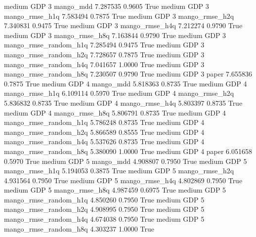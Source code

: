     medium      GDP                 3             mango_mdd   7.287535      0.9605    True
    medium      GDP                 3        mango_rmse_h1q   7.583494      0.7875    True
    medium      GDP                 3        mango_rmse_h2q   7.340831      0.9475    True
    medium      GDP                 3        mango_rmse_h4q   7.212274      0.9790    True
    medium      GDP                 3        mango_rmse_h8q   7.163844      0.9790    True
    medium      GDP                 3 mango_rmse_random_h1q   7.285494      0.9475    True
    medium      GDP                 3 mango_rmse_random_h2q   7.728657      0.7875    True
    medium      GDP                 3 mango_rmse_random_h4q   7.041657      1.0000    True
    medium      GDP                 3 mango_rmse_random_h8q   7.230507      0.9790    True
    medium      GDP                 3                 paper   7.655836      0.7875    True
    medium      GDP                 4             mango_mdd   5.818363      0.8735    True
    medium      GDP                 4        mango_rmse_h1q   6.109114      0.5970    True
    medium      GDP                 4        mango_rmse_h2q   5.836832      0.8735    True
    medium      GDP                 4        mango_rmse_h4q   5.803397      0.8735    True
    medium      GDP                 4        mango_rmse_h8q   5.806791      0.8735    True
    medium      GDP                 4 mango_rmse_random_h1q   5.786248      0.8735    True
    medium      GDP                 4 mango_rmse_random_h2q   5.866589      0.8555    True
    medium      GDP                 4 mango_rmse_random_h4q   5.537626      0.8735    True
    medium      GDP                 4 mango_rmse_random_h8q   5.380090      1.0000    True
    medium      GDP                 4                 paper   6.051658      0.5970    True
    medium      GDP                 5             mango_mdd   4.908807      0.7950    True
    medium      GDP                 5        mango_rmse_h1q   5.194053      0.3875    True
    medium      GDP                 5        mango_rmse_h2q   4.931564      0.7950    True
    medium      GDP                 5        mango_rmse_h4q   4.802869      0.7950    True
    medium      GDP                 5        mango_rmse_h8q   4.987459      0.6975    True
    medium      GDP                 5 mango_rmse_random_h1q   4.850260      0.7950    True
    medium      GDP                 5 mango_rmse_random_h2q   4.908995      0.7950    True
    medium      GDP                 5 mango_rmse_random_h4q   4.674038      0.7950    True
    medium      GDP                 5 mango_rmse_random_h8q   4.303237      1.0000    True
